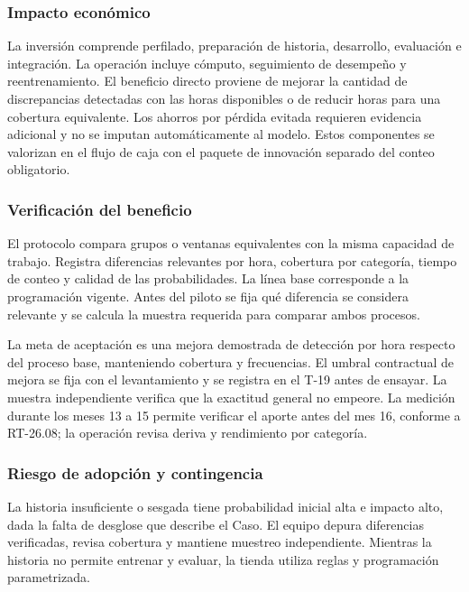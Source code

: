 \documentclass[11pt]{article}
\begin{document}
\subsubsection{Impacto económico}\label{impacto-econuxf3mico-1}

La inversión comprende perfilado, preparación de historia, desarrollo, evaluación e integración. La operación incluye cómputo, seguimiento de desempeño y reentrenamiento. El beneficio directo proviene de mejorar la cantidad de discrepancias detectadas con las horas disponibles o de reducir horas para una cobertura equivalente. Los ahorros por pérdida evitada requieren evidencia adicional y no se imputan automáticamente al modelo. Estos componentes se valorizan en el flujo de caja con el paquete de innovación separado del conteo obligatorio.

\subsubsection{Verificación del beneficio}\label{verificaciuxf3n-del-beneficio-1}

El protocolo compara grupos o ventanas equivalentes con la misma capacidad de trabajo. Registra diferencias relevantes por hora, cobertura por categoría, tiempo de conteo y calidad de las probabilidades. La línea base corresponde a la programación vigente. Antes del piloto se fija qué diferencia se considera relevante y se calcula la muestra requerida para comparar ambos procesos.

La meta de aceptación es una mejora demostrada de detección por hora respecto del proceso base, manteniendo cobertura y frecuencias. El umbral contractual de mejora se fija con el levantamiento y se registra en el T-19 antes de ensayar. La muestra independiente verifica que la exactitud general no empeore. La medición durante los meses 13 a 15 permite verificar el aporte antes del mes 16, conforme a RT-26.08; la operación revisa deriva y rendimiento por categoría.

\subsubsection{Riesgo de adopción y contingencia}\label{riesgo-de-adopciuxf3n-y-contingencia-1}

La historia insuficiente o sesgada tiene probabilidad inicial alta e impacto alto, dada la falta de desglose que describe el Caso. El equipo depura diferencias verificadas, revisa cobertura y mantiene muestreo independiente. Mientras la historia no permite entrenar y evaluar, la tienda utiliza reglas y programación parametrizada.
\end{document}
